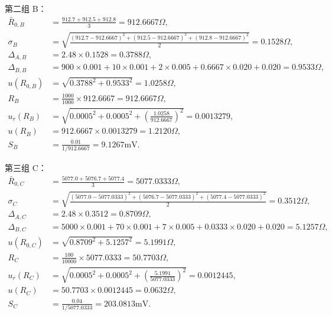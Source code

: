 \documentclass[UTF8,a4paper,12pt]{ctexart}
\begin{document}
第二组 B：
{\small
\begin{align*}
\bar R_{0,B}&=\frac{912.7+912.5+912.8}{3}=912.6667\Omega,\\
\sigma_B&=\sqrt{\frac{(912.7-912.6667)^2+(912.5-912.6667)^2+(912.8-912.6667)^2}{2}}=0.1528\Omega,\\
\Delta_{A,B}&=2.48\times0.1528=0.3788\Omega,\\
\Delta_{B,B}&=900\times0.001+10\times0.001+2\times0.005+0.6667\times0.020+0.020=0.9533\Omega,\\
 u(R_{0,B})&=\sqrt{0.3788^2+0.9533^2}=1.0258\Omega,\\
 R_B&=\frac{1000}{1000}\times912.6667=912.6667\Omega,\\
 u_r(R_B)&=\sqrt{0.0005^2+0.0005^2+\left(\frac{1.0258}{912.6667}\right)^2}=0.0013279,\\
 u(R_B)&=912.6667\times0.0013279=1.2120\Omega,\\
 S_B&=\frac{0.01}{1/912.6667}=9.1267\mathrm{mV}.
\end{align*}}

第三组 C：
{\small
\begin{align*}
\bar R_{0,C}&=\frac{5077.0+5076.7+5077.4}{3}=5077.0333\Omega,\\
\sigma_C&=\sqrt{\frac{(5077.0-5077.0333)^2+(5076.7-5077.0333)^2+(5077.4-5077.0333)^2}{2}}=0.3512\Omega,\\
\Delta_{A,C}&=2.48\times0.3512=0.8709\Omega,\\
\Delta_{B,C}&=5000\times0.001+70\times0.001+7\times0.005+0.0333\times0.020+0.020=5.1257\Omega,\\
 u(R_{0,C})&=\sqrt{0.8709^2+5.1257^2}=5.1991\Omega,\\
 R_C&=\frac{100}{10000}\times5077.0333=50.7703\Omega,\\
 u_r(R_C)&=\sqrt{0.0005^2+0.0005^2+\left(\frac{5.1991}{5077.0333}\right)^2}=0.0012445,\\
 u(R_C)&=50.7703\times0.0012445=0.0632\Omega,\\
 S_C&=\frac{0.04}{1/5077.0333}=203.0813\mathrm{mV}.
\end{align*}}

\begin{table}[H]
\centering
\caption{惠斯登电桥法数据处理结果}
\label{tab:wheatstone_processed}
\end{table}
\end{document}
